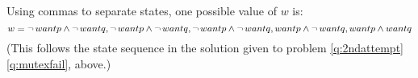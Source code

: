 \documentclass[]{exam}
\begin{document}
\begin{questions}
\begin{solution}
Using commas to separate states, one possible value of $w$ is:
\[w = \mathop{\neg} wantp\land \mathop{\neg} wantq,\mathop{\neg} wantp\land \mathop{\neg} wantq,\mathop{\neg} wantp\land \mathop{\neg}
wantq,wantp\land \mathop{\neg} wantq,wantp\land wantq\]
(This follows the state sequence in the solution given to problem
\ref{q:2ndattempt}\ref{q:mutexfail}, above.)
\end{solution}

\end{questions}
\end{document}
